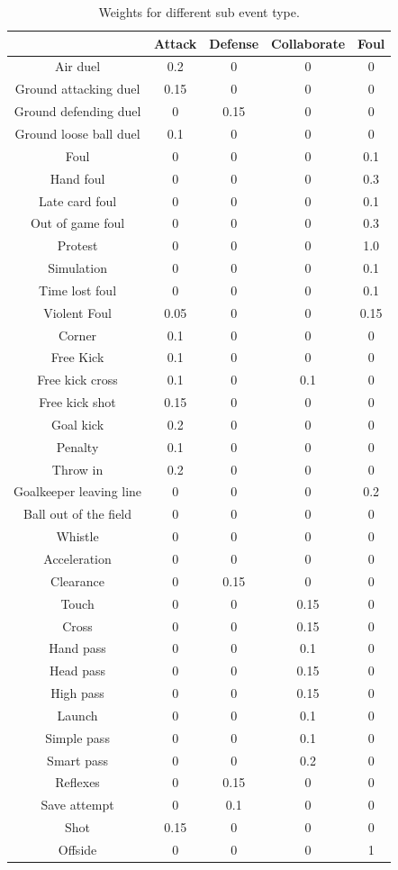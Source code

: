 \documentclass{mcmthesis}
\begin{document}
\begin{appendices}
        \begin{table}[h!]
			\centering
			\begin{tabular}{ccccc}
				\toprule
				& Attack & Defense & Collaborate & Foul \\
				\midrule
				Air duel  & 0.2 & 0 & 0 & 0\\
				Ground attacking duel  & 0.15 & 0 & 0 & 0\\
				Ground defending duel  & 0 & 0.15 & 0 & 0\\
				Ground loose ball duel  & 0.1 & 0 & 0 & 0\\
				Foul  & 0 & 0 & 0 & 0.1\\
				Hand foul  & 0 & 0 & 0 & 0.3\\
				Late card foul  & 0 & 0 & 0 & 0.1\\
				Out of game foul  & 0 & 0 & 0 & 0.3\\
				Protest  & 0 & 0 & 0 & 1.0\\
				Simulation  & 0 & 0 & 0 & 0.1\\
				Time lost foul  & 0 & 0 & 0 & 0.1\\
				Violent Foul  & 0.05 & 0 & 0 & 0.15\\
				Corner  & 0.1 & 0 & 0 & 0\\
				Free Kick  & 0.1 & 0 & 0 & 0\\
				Free kick cross  & 0.1 & 0 & 0.1 & 0\\
				Free kick shot  & 0.15 & 0 & 0 & 0\\
				Goal kick  & 0.2 & 0 & 0 & 0\\
				Penalty  & 0.1 & 0 & 0 & 0\\
				Throw in  & 0.2 & 0 & 0 & 0\\
				Goalkeeper leaving line  & 0 & 0 & 0 & 0.2\\
				Ball out of the field  & 0 & 0 & 0 & 0\\
				Whistle  & 0 & 0 & 0 & 0\\
				Acceleration  & 0 & 0 & 0 & 0\\
				Clearance  & 0 & 0.15 & 0 & 0\\
				Touch  & 0 & 0 & 0.15 & 0\\
				Cross  & 0 & 0 & 0.15 & 0\\
				Hand pass  & 0 & 0 & 0.1 & 0\\
				Head pass  & 0 & 0 & 0.15 & 0\\
				High pass  & 0 & 0 & 0.15 & 0\\
				Launch  & 0 & 0 & 0.1 & 0\\
				Simple pass  & 0 & 0 & 0.1 & 0\\
				Smart pass  & 0 & 0 & 0.2 & 0\\
				Reflexes  & 0 & 0.15 & 0 & 0\\
				Save attempt  & 0 & 0.1 & 0 & 0\\
				Shot  & 0.15 & 0 & 0 & 0\\
				Offside & 0 & 0 & 0 & 1 \\
				\bottomrule
			\end{tabular}
			\caption{Weights for different sub event type. }
		\end{table}	
		
	\end{appendices}
\end{document}
